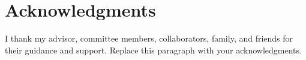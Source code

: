 \chapter*{Acknowledgments}

I thank my advisor, committee members, collaborators, family, and friends for their guidance and support. Replace this paragraph with your acknowledgments.

